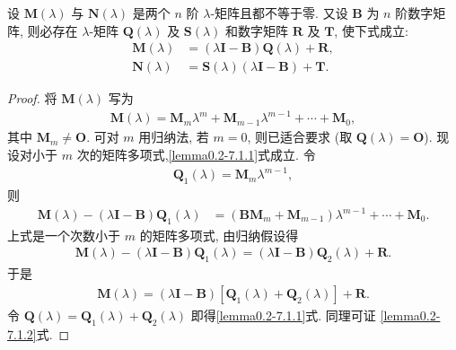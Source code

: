\documentclass[../../main.tex]{subfiles}
\begin{document}
\begin{lemma}\label{lemma:lambda-矩阵的性质1}
设 $\boldsymbol{M}(\lambda)$ 与 $\boldsymbol{N}(\lambda)$ 是两个 $n$ 阶 $\lambda$-矩阵且都不等于零. 又设 $\boldsymbol{B}$ 为 $n$ 阶数字矩阵, 则必存在 $\lambda$-矩阵 $\boldsymbol{Q}(\lambda)$ 及 $\boldsymbol{S}(\lambda)$ 和数字矩阵 $\boldsymbol{R}$ 及 $\boldsymbol{T}$, 使下式成立:
\begin{align}
\boldsymbol{M}(\lambda)&=(\lambda\boldsymbol{I}-\boldsymbol{B})\boldsymbol{Q}(\lambda)+\boldsymbol{R}, \label{lemma0.2-7.1.1}\\
\boldsymbol{N}(\lambda)&=\boldsymbol{S}(\lambda)(\lambda\boldsymbol{I}-\boldsymbol{B})+\boldsymbol{T}. \label{lemma0.2-7.1.2}
\end{align}
\end{lemma}
\begin{proof}
将 $\boldsymbol{M}(\lambda)$ 写为
\begin{align*}
\boldsymbol{M}(\lambda)=\boldsymbol{M}_m\lambda^m+\boldsymbol{M}_{m - 1}\lambda^{m - 1}+\cdots+\boldsymbol{M}_0,
\end{align*}
其中 $\boldsymbol{M}_m\neq\boldsymbol{O}$. 可对 $m$ 用归纳法, 若 $m = 0$, 则已适合要求 (取 $\boldsymbol{Q}(\lambda)=\boldsymbol{O}$). 现设对小于 $m$ 次的矩阵多项式,\eqref{lemma0.2-7.1.1}式成立. 令
\begin{align*}
\boldsymbol{Q}_1(\lambda)=\boldsymbol{M}_m\lambda^{m - 1},
\end{align*}
则
\begin{align}
\boldsymbol{M}(\lambda)-(\lambda\boldsymbol{I}-\boldsymbol{B})\boldsymbol{Q}_1(\lambda)&=(\boldsymbol{B}\boldsymbol{M}_m+\boldsymbol{M}_{m - 1})\lambda^{m - 1}+\cdots+\boldsymbol{M}_0. \label{lemma0.2-7.1.3}
\end{align}
上式是一个次数小于 $m$ 的矩阵多项式, 由归纳假设得
\begin{align*}
\boldsymbol{M}(\lambda)-(\lambda\boldsymbol{I}-\boldsymbol{B})\boldsymbol{Q}_1(\lambda)=(\lambda\boldsymbol{I}-\boldsymbol{B})\boldsymbol{Q}_2(\lambda)+\boldsymbol{R}.
\end{align*}
于是
\begin{align*}
\boldsymbol{M}(\lambda)=(\lambda\boldsymbol{I}-\boldsymbol{B})[\boldsymbol{Q}_1(\lambda)+\boldsymbol{Q}_2(\lambda)]+\boldsymbol{R}.
\end{align*}
令 $\boldsymbol{Q}(\lambda)=\boldsymbol{Q}_1(\lambda)+\boldsymbol{Q}_2(\lambda)$ 即得\eqref{lemma0.2-7.1.1}式. 同理可证 \eqref{lemma0.2-7.1.2}式. 

\end{proof}
\end{document}
